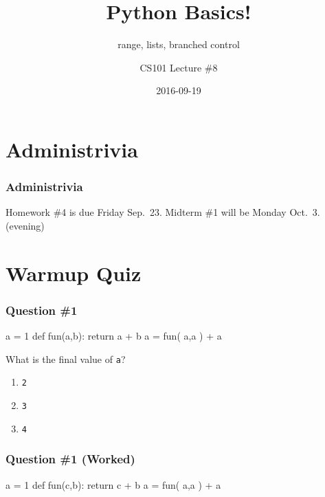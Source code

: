 \documentclass[11pt]{beamer}
\title{Python Basics!}
\subtitle{range, lists, branched control}
\author{CS101 Lecture \#8}
\date{2016-09-19}
\begin{document}
  \setcounter{showProgressBar}{0}
  \setcounter{showSlideNumbers}{0}

\frame{\titlepage}

\setcounter{framenumber}{0}
\setcounter{showProgressBar}{1}
\setcounter{showSlideNumbers}{1}

\section{Administrivia}

\begin{frame}
  \frametitle{Administrivia}
  \Enlarge
  \begin{itemize}
  \myitem  Homework \#4 is due Friday Sep.\ 23.
  \myitem  Midterm \#1 will be Monday Oct.\ 3.  (evening)
  \end{itemize}
\end{frame}

\section{Warmup Quiz}

\begin{frame}[fragile]
  \frametitle{Question \#1}
  \Enlarge

  \begin{semiverbatim}
a = 1
def fun(a,b):
    return a + b
a = fun( a,a ) + a
  \end{semiverbatim}
  What is the final value of \texttt{a}?
  \begin{enumerate}[label=\Alph*]
  \item  \texttt{2}
  \item  \texttt{3}
  \item  \texttt{4}
  \end{enumerate}
\end{frame}

\begin{frame}[fragile]
  \frametitle{Question \#1 (Worked)}
  \Enlarge

  \begin{semiverbatim}
a = 1
def fun(c,b):
    return c + b
a = fun( a,a ) + a
  \end{semiverbatim}
\end{frame}
\end{document}
